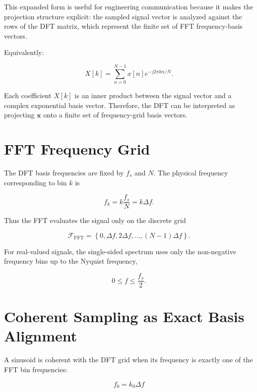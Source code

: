 ﻿\documentclass[11pt]{article}
\begin{document}
This expanded form is useful for engineering communication because it makes the projection structure explicit: the sampled signal vector is analyzed against the rows of the DFT matrix, which represent the finite set of FFT frequency-basis vectors.

Equivalently:

\begin{equation}
X[k]
=
\sum_{n=0}^{N-1} x[n] e^{-j2\pi kn/N}.
\end{equation}

Each coefficient $X[k]$ is an inner product between the signal vector and a complex exponential basis vector. Therefore, the DFT can be interpreted as projecting $\bm{x}$ onto a finite set of frequency-grid basis vectors.

\section{FFT Frequency Grid}

The DFT basis frequencies are fixed by $f_s$ and $N$. The physical frequency corresponding to bin $k$ is

\begin{equation}
f_k = k \frac{f_s}{N} = k\Delta f.
\end{equation}

Thus the FFT evaluates the signal only on the discrete grid

\begin{equation}
\mathcal{F}_{\text{FFT}}
=
\left\{
0,\Delta f,2\Delta f,\ldots,(N-1)\Delta f
\right\}.
\end{equation}

For real-valued signals, the single-sided spectrum uses only the non-negative frequency bins up to the Nyquist frequency,

\begin{equation}
0 \leq f \leq \frac{f_s}{2}.
\end{equation}

\section{Coherent Sampling as Exact Basis Alignment}

A sinusoid is coherent with the DFT grid when its frequency is exactly one of the FFT bin frequencies:

\begin{equation}
f_0 = k_0 \Delta f
\end{equation}
\end{document}
